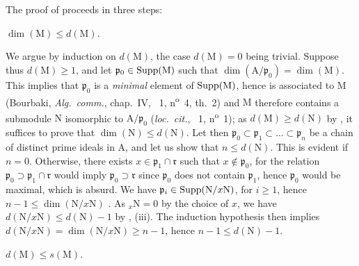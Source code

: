 The proof of  proceeds in three steps:

\begin{env}[16.2.3.2]
\label{0.16.2.3.2}
$\dim(\mathrm{M})\leq d(\mathrm{M})$.
\end{env}

We argue by induction on $d(\mathrm{M})$, the case $d(\mathrm{M})=0$ being trivial.
Suppose thus $d(\mathrm{M})\geq 1$, and let $\mathfrak{p}_0\in\operatorname{Supp}(\mathrm{M})$ such that $\dim(\mathrm{A}/\mathfrak{p}_0)=\dim(\mathrm{M})$.
This implies that $\mathfrak{p}_0$ is a \emph{minimal} element of $\operatorname{Supp}(\mathrm{M})$, hence is associated to $\mathrm{M}$ (Bourbaki, \emph{Alg.~comm.}, chap.~IV, \textsection~1, n\textsuperscript{o}~4, th.~2) and $\mathrm{M}$ therefore contains a submodule $\mathrm{N}$ isomorphic to $\mathrm{A}/\mathfrak{p}_0$ (\emph{loc.~cit.}, \textsection~1, n\textsuperscript{o}~1); as $d(\mathrm{M})\geq d(\mathrm{N})$ by , it suffices to prove that $\dim(\mathrm{N})\leq d(\mathrm{N})$.
Let then $\mathfrak{p}_0\subset\mathfrak{p}_1\subset\ldots\subset\mathfrak{p}_n$ be a chain of distinct prime ideals in $\mathrm{A}$, and let us show that $n\leq d(\mathrm{N})$.
This is evident if $n=0$.
Otherwise, there exists $x\in\mathfrak{p}_1\cap\mathfrak{r}$ such that $x\notin\mathfrak{p}_0$, for the relation $\mathfrak{p}_0\supset\mathfrak{p}_1\cap\mathfrak{r}$ would imply $\mathfrak{p}_0\supset\mathfrak{r}$ since $\mathfrak{p}_0$ does not contain $\mathfrak{p}_1$, hence $\mathfrak{p}_0$ would be maximal, which is absurd.
We have $\mathfrak{p}_i\in\operatorname{Supp}(\mathrm{N}/x\mathrm{N})$, for $i\geq 1$, hence $n-1\leq\dim(\mathrm{N}/x\mathrm{N})$ .
As ${}_x\mathrm{N}=0$ by the choice of $x$, we have $d(\mathrm{N}/x\mathrm{N})\leq d(\mathrm{N})-1$ by , (iii).
The induction hypothesis then implies $d(\mathrm{N}/x\mathrm{N})=\dim(\mathrm{N}/x\mathrm{N})\geq n-1$, hence $n-1\leq d(\mathrm{N})-1$.

\begin{env}[16.2.3.3]
\label{0.16.2.3.3}
$d(\mathrm{M})\leq s(\mathrm{M})$.
\end{env}


